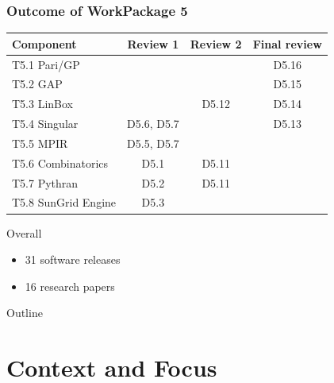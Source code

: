 \documentclass{beamer}
\begin{document}
\begin{frame}
  \frametitle{Outcome of WorkPackage 5}

  \begin{tabular}{lccc}
    \toprule
    Component & Review 1 & Review 2 & Final review\\
    \midrule
    T5.1 Pari/GP & & & {\color{green} D5.16} \\
    T5.2 GAP     & & & {\color{green} D5.15} \\
    T5.3 LinBox  & & \alert{D5.12} & {\color{green} D5.14} \\
    T5.4 Singular& D5.6, D5.7 & & {\color{green} D5.13} \\
    T5.5 MPIR    & D5.5, D5.7& & \\
    T5.6 Combinatorics  & D5.1& \alert{D5.11} & \\
    T5.7 Pythran        & D5.2 & \alert{D5.11} & \\
    T5.8 SunGrid Engine & D5.3 & & \\
    \bottomrule
    
  \end{tabular}

  \vspace{1em}
  
  Overall
  \begin{itemize}
  \item 31 software releases
  \item 16 research papers
  \end{itemize}
\end{frame}

\begin{frame}  {Outline}
  \tableofcontents
\end{frame}



\section{Context and Focus}
\end{document}
